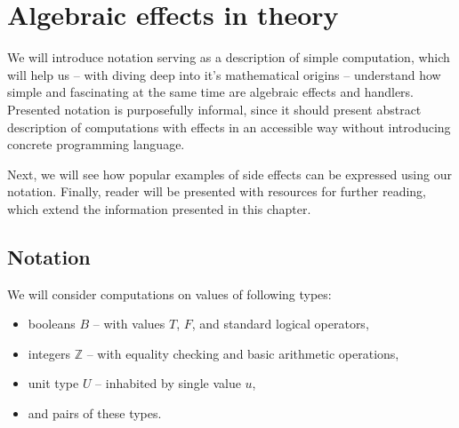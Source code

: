
\chapter{Algebraic effects in theory}

We will introduce notation serving as a description of simple computation, which will help us -- with diving deep into it's mathematical origins -- understand how simple and fascinating at the same time are algebraic effects and handlers. Presented notation is purposefully informal, since it should present abstract description of computations with effects in an accessible way without introducing concrete programming language.

Next, we will see how popular examples of side effects can be expressed using our notation. Finally, reader will be presented with resources for further reading, which extend the information presented in this chapter.

\section{Notation}

\newcommand{\return}[1]{\mathbf{return}\ #1}
\newcommand{\op}[3]{#1(#2, #3)}
\newcommand{\opi}[3]{\op{op_{#1}}{#2}{#3}}
\newcommand{\handle}[2]{\mathbf{handle}\ #1\ \mathbf{with}\ #2}
\newcommand{\hcase}[3]{#1\ #2\ \Rightarrow\ #3}
\newcommand{\fun}[2]{\lambda #1.\ #2}
\newcommand{\cond}[3]{\mathbf{if}\ #1\ \mathbf{then}\ #2\ \mathbf{else}\ #3}

We will consider computations on values of following types:
\begin{itemize}
\item booleans \(B\) -- with values \(T\), \(F\), and standard logical operators,
\item integers \(\mathbb{Z}\) -- with equality checking and basic arithmetic operations,
\item unit type \(U\) -- inhabited by single value \(u\),
\item and pairs of these types.
\end{itemize}

% 
% 

